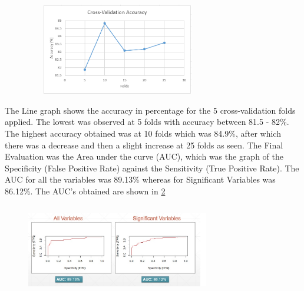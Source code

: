 \documentclass[conference]{IEEEtran}
\begin{document}
 
 \begin{figure}
 	\centering
 	\includegraphics[height=4cm, width=8cm]{images/Fig8}
 	\linebreak
 	\label{fig8}
 \end{figure}
 
  
The Line graph shows the accuracy in percentage for the 5 cross-validation folds applied. The lowest was observed at 5 folds with accuracy between 81.5 - 82\%. The highest accuracy obtained was at 10 folds which was 84.9\%, after which there was a decrease and then a slight increase at 25 folds as seen.  
The Final Evaluation was the Area under the curve (AUC), which was the graph of the Specificity (False Positive Rate) against the Sensitivity (True Positive Rate). The AUC for all the variables was 89.13\% whereas for Significant Variables was 86.12\%. The AUC’s obtained are shown in \ref{fig9}
  
\begin{figure}
  	\centering
  	\includegraphics[height=4cm, width=8cm]{images/Fig9}
  	\linebreak
  	\label{fig9}
\end{figure}
  
\end{document}

